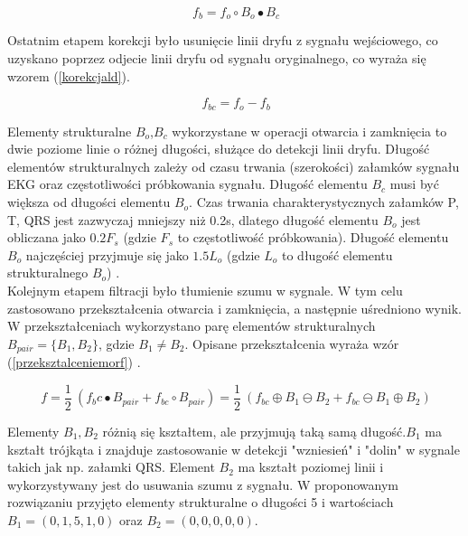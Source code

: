 \documentclass[10pt,a4paper]{article}
\begin{document}
\begin{equation}
\ f_b = f_o \circ B_o \bullet B_c
\label{liniadryftu}
\end{equation}  

Ostatnim etapem korekcji było usunięcie linii dryfu z sygnału wejściowego, co uzyskano poprzez odjecie linii dryfu od sygnału oryginalnego, co wyraża się wzorem (\ref{korekcjald}).

\begin{equation}
\ f_{bc} = f_o - f_b
\label{korekcjald}
\end{equation}

Elementy strukturalne $B_o$,$B_c$ wykorzystane w operacji otwarcia i zamknięcia to dwie poziome linie o różnej długości, służące do detekcji linii dryfu. Długość elementów strukturalnych zależy od czasu trwania (szerokości) załamków sygnału EKG oraz częstotliwości próbkowania sygnału. Długość elementu $B_c$ musi być większa od długości elementu $B_o$. Czas trwania charakterystycznych załamków P, T, QRS jest zazwyczaj mniejszy niż 0.2s, dlatego długość elementu $B_o$ jest obliczana jako $0.2F_s$ (gdzie $F_s$ to częstotliwość próbkowania). Długość elementu $B_o$ najczęściej przyjmuje się jako $1.5L_o$ (gdzie $L_o$ to długość elementu strukturalnego $B_o$)  \cite{filtering}.\\

Kolejnym etapem filtracji było tłumienie szumu w sygnale. W tym celu zastosowano przekształcenia otwarcia i zamknięcia, a następnie uśredniono wynik. W przekształceniach wykorzystano parę elementów strukturalnych $B_{pair} = \lbrace B_1, B_2\rbrace$, gdzie $B_1 \neq B_2$. Opisane przekształcenia wyraża wzór (\ref{przeksztalceniemorf})  \cite{filtering}.

\begin{equation}
\ f = \frac{1}{2}\ (f_bc \bullet B_{pair} + f_{bc} \circ B_{pair})  = \frac{1}{2}\  (f_{bc} \oplus B_1 \ominus B_2 + f_{bc} \ominus B_1 \oplus B_2)
\label{przeksztalceniemorf}
\end{equation}

Elementy $B_1, B_2$ różnią się kształtem, ale przyjmują taką samą długość.$B_1$ ma kształt trójkąta i znajduje zastosowanie w detekcji "wzniesień" i "dolin" w sygnale takich jak np. załamki QRS. Element $B_2$ ma kształt poziomej linii i wykorzystywany jest do usuwania szumu z sygnału. W proponowanym rozwiązaniu przyjęto elementy strukturalne o długości 5 i wartościach $B_1 = (0,1,5,1,0)$ oraz $B_2 = (0,0,0,0,0)$. \\
\end{document}
